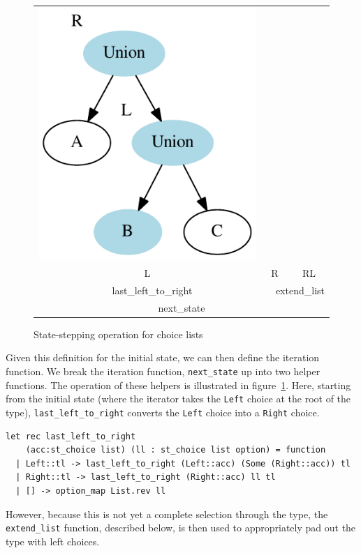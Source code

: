 \documentclass[a4paper,english]{lipics-v2018}
\begin{document}
\begin{figure}
\begin{tabular}{cccc}
\includegraphics[scale=0.6]{figures-gen/example3.pdf} \\
L & \multicolumn{2}{c}{R} & RL \\
\multicolumn{2}{c}{last\_left\_to\_right} & \multicolumn{2}{c}{extend\_list} \\
\hline
\multicolumn{4}{c}{next\_state} \\
\end{tabular}
\caption{State-stepping operation for choice lists}
\label{fig:sstep}
\end{figure}

Given this definition for the initial state, we can then define the
iteration function.  We break the iteration function,
\verb|next_state| up into two helper functions. The operation of these
helpers is illustrated in figure~\ref{fig:sstep}. Here, starting from
the initial state (where the iterator takes the \verb+Left+ choice at the
root of the type), \verb|last_left_to_right| converts the \verb+Left+ choice
into a \verb+Right+ choice.
\begin{small}
\begin{verbatim}
let rec last_left_to_right 
    (acc:st_choice list) (ll : st_choice list option) = function
  | Left::tl -> last_left_to_right (Left::acc) (Some (Right::acc)) tl
  | Right::tl -> last_left_to_right (Right::acc) ll tl
  | [] -> option_map List.rev ll
\end{verbatim}
\end{small}
However, because this is not yet a complete selection through the
type, the \verb|extend_list| function, described below, is then used
to appropriately pad out the type with left choices.
\end{document}
